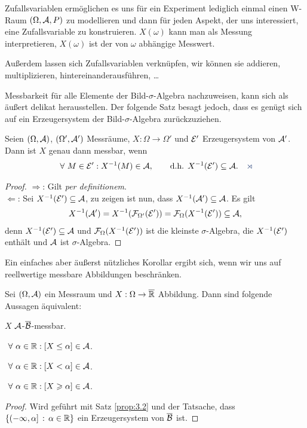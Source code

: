 Zufallsvariablen ermöglichen es uns für ein Experiment lediglich einmal einen
W-Raum $(\Omega,\AA,P)$ zu modellieren und dann für jeden Aspekt, der uns
interessiert, eine Zufallsvariable zu konstruieren. $X(\omega)$ kann man als
Messung interpretieren, $X(\omega)$ ist der von $\omega$ abhängige Messwert.

Außerdem lassen sich Zufallsvariablen verknüpfen, wir können sie addieren,
multiplizieren, hintereinanderausführen, \ldots

Messbarkeit für alle Elemente der Bild-$\sigma$-Algebra nachzuweisen, kann sich
als äußert delikat herausstellen. Der folgende Satz besagt jedoch, dass
es genügt sich auf ein Erzeugersystem der Bild-$\sigma$-Algebra
zurückzuziehen.

\begin{prop}
\label{prop:3.2}
Seien $(\Omega, \AA)$, $(\Omega ', {\cal A '})$ Messräume, $ X:
\Omega \to \Omega '$ und ${\EE}'$ Erzeugersystem  von $\AA'$.
Dann ist $X$ genau dann messbar, wenn
\begin{align*}
\forall M\in {\EE}' : X^{-1}(M)\in \AA,\qquad
\text{d.h. } X^{-1}({\EE}') \subseteq \AA.\fishhere
\end{align*}
\end{prop}
\begin{proof}
$\Rightarrow$: Gilt \textit{per definitionem}.\\
$\Leftarrow$: Sei $X^{-1}(\EE')\subseteq \AA $, zu zeigen ist nun, dass
$X^{-1}(\AA')\subseteq \AA$. Es gilt
\begin{align*}
X^{-1}(\AA') = X^{-1}(\FF_{\Omega'}(\EE')) = \FF_\Omega(X^{-1}(\EE')) \subseteq
\AA,
\end{align*}
denn $X^{-1}(\EE')\subseteq \AA$ und $\FF_\Omega(X^{-1}(\EE'))$ ist die
kleinste $\sigma$-Algebra, die $X^{-1}(\EE')$ enthält und $\AA$ ist
$\sigma$-Algebra.\qedhere
\end{proof}
 
Ein einfaches aber äußerst nützliches Korollar ergibt sich, wenn wir uns auf
reellwertige messbare Abbildungen beschränken.
\begin{prop}[Korollar]
\label{prop:3.3}
Sei $(\Omega, \AA)$ ein Messraum und $X: \Omega \to \overline{\R}$
Abbildung. Dann sind folgende Aussagen äquivalent:
\begin{equivenum}
  \item $X$ $\AA$-$\overline{\BB}$-messbar.
  \item $\forall \alpha \in \R : [X \leq \alpha] \in \AA$.
  \item $\forall \alpha \in \R : [X < \alpha] \in \AA$.
  \item $\forall \alpha \in \R : [X \ge \alpha] \in \AA$.\fishhere
\end{equivenum}
\end{prop}
\begin{proof}
Wird geführt mit Satz \ref{prop:3.2} und der Tatsache, dass
$\setdef{(-\infty,\alpha]}{\alpha\in\R}$ ein Erzeugersystem von
$\overline{\BB}$ ist.\qedhere
\end{proof}

